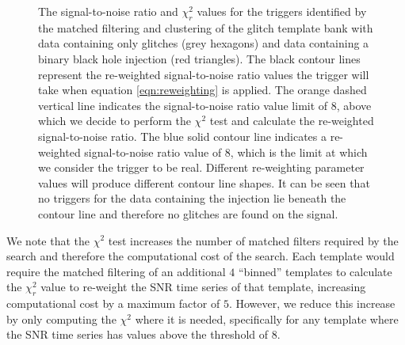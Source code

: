 \begin{figure}
  \caption{The signal-to-noise ratio and $\chi_{r}^{2}$ values for the triggers identified by the matched filtering and clustering of the \scl{} glitch template bank with data containing only \scl{} glitches (grey hexagons) and data containing a binary black hole \gw{} injection (red triangles). The black contour lines represent the re-weighted signal-to-noise ratio values the trigger will take when equation \ref{eqn:reweighting} is applied. The orange dashed vertical line indicates the signal-to-noise ratio value limit of 8, above which we decide to perform the $\chi^{2}$ test and calculate the re-weighted signal-to-noise ratio. The blue solid contour line indicates a re-weighted signal-to-noise ratio value of 8, which is the limit at which we consider the trigger to be real. Different re-weighting parameter values will produce different contour line shapes. It can be seen that no triggers for the data containing the \gw{} injection lie beneath the contour line and therefore no \scl{} glitches are found on the \gw{} signal.}
  \label{fig:chi_snr}
\end{figure}

We note that the $\chi^{2}$ test increases the number of matched filters required by the search and therefore the computational cost of the search. Each template would require the matched filtering of an additional $4$ ``binned'' templates to calculate the $\chi_{r}^{2}$ value to re-weight the SNR time series of that template, increasing computational cost by a maximum factor of $5$. However, we reduce this increase by only computing the $\chi^{2}$ where it is needed, specifically for any template where the SNR time series has values above the threshold of 8.


